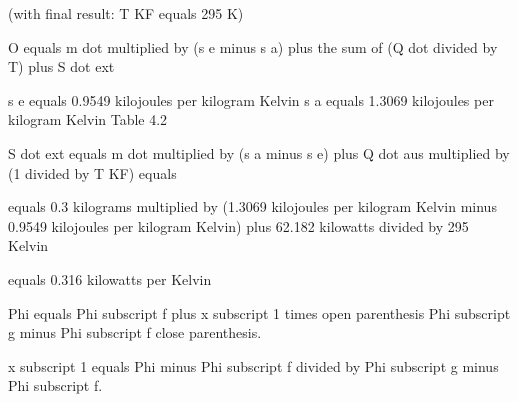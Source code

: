 (with final result: T KF equals 295 K)

O equals m dot multiplied by (s e minus s a) plus the sum of (Q dot divided by T) plus S dot ext

s e equals 0.9549 kilojoules per kilogram Kelvin  
s a equals 1.3069 kilojoules per kilogram Kelvin  
Table 4.2

S dot ext equals m dot multiplied by (s a minus s e) plus Q dot aus multiplied by (1 divided by T KF) equals

equals 0.3 kilograms multiplied by (1.3069 kilojoules per kilogram Kelvin minus 0.9549 kilojoules per kilogram Kelvin) plus 62.182 kilowatts divided by 295 Kelvin

equals 0.316 kilowatts per Kelvin

Phi equals Phi subscript f plus x subscript 1 times open parenthesis Phi subscript g minus Phi subscript f close parenthesis.

x subscript 1 equals Phi minus Phi subscript f divided by Phi subscript g minus Phi subscript f.